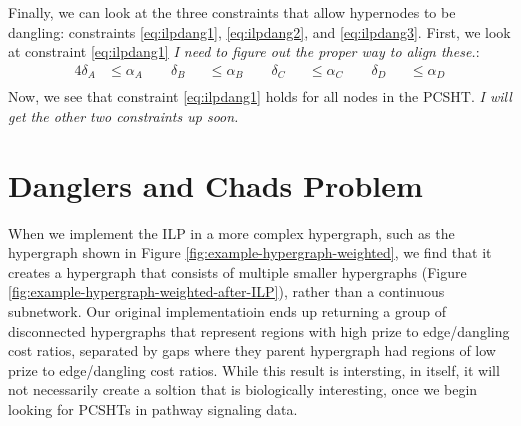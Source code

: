 \documentclass[12pt,twoside]{reedthesis}
\theoremstyle{definition}
\begin{document}
Finally, we can look at the three constraints that allow hypernodes to be dangling: constraints \eqref{eq:ilpdang1}, \eqref{eq:ilpdang2}, and \eqref{eq:ilpdang3}. First, we look at constraint \eqref{eq:ilpdang1} \emph{I need to figure out the proper way to align these.}:
\begin{alignat*}{4}
  \delta_A &\leq \alpha_A \qquad \delta_B &&\leq \alpha_B \qquad \delta_C &&\leq \alpha_C \qquad \delta_D &&\leq \alpha_D\\
\end{alignat*}
Now, we see that constraint \eqref{eq:ilpdang1} holds for all nodes in the PCSHT. \emph{I will get the other two constraints up soon.}\par

\section{Danglers and Chads Problem}

When we implement the ILP in a more complex hypergraph, such as the hypergraph shown in Figure \ref{fig:example-hypergraph-weighted}, we find that it creates a hypergraph that consists of multiple smaller hypergraphs (Figure \ref{fig:example-hypergraph-weighted-after-ILP}), rather than a continuous subnetwork. Our original implementatioin ends up returning a group of disconnected hypergraphs that represent regions with high prize to edge/dangling cost ratios, separated by gaps where they parent hypergraph had regions of low prize to edge/dangling cost ratios. While this result is intersting, in itself, it will not necessarily create a soltion that is biologically interesting, once we begin looking for PCSHTs in pathway signaling data.\par
\end{document}
